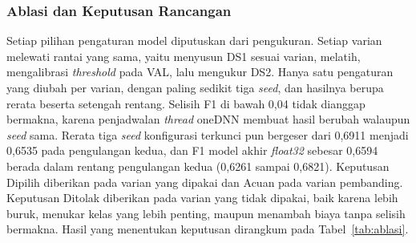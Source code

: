 
\subsubsection{Ablasi dan Keputusan Rancangan}

Setiap pilihan pengaturan model diputuskan dari pengukuran. Setiap varian melewati rantai yang sama, yaitu menyusun DS1 sesuai varian, melatih, mengalibrasi \textit{threshold} pada VAL, lalu mengukur DS2. Hanya satu pengaturan yang diubah per varian, dengan paling sedikit tiga \textit{seed}, dan hasilnya berupa rerata beserta setengah rentang. Selisih F1 di bawah 0,04 tidak dianggap bermakna, karena penjadwalan \textit{thread} oneDNN membuat hasil berubah walaupun \textit{seed} sama. Rerata tiga \textit{seed} konfigurasi terkunci pun bergeser dari 0,6911 menjadi 0,6535 pada pengulangan kedua, dan F1 model akhir \textit{float32} sebesar 0,6594 berada dalam rentang pengulangan kedua (0,6261 sampai 0,6821). Keputusan Dipilih diberikan pada varian yang dipakai dan Acuan pada varian pembanding. Keputusan Ditolak diberikan pada varian yang tidak dipakai, baik karena lebih buruk, menukar kelas yang lebih penting, maupun menambah biaya tanpa selisih bermakna. Hasil yang menentukan keputusan dirangkum pada Tabel~\ref{tab:ablasi}.

